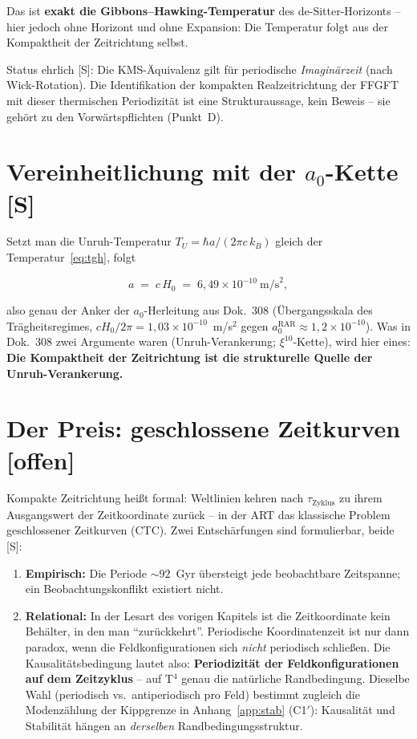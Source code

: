 \documentclass[11pt]{report}
\begin{document}
Das ist \textbf{exakt die Gibbons--Hawking-Temperatur} des
de-Sitter-Horizonts -- hier jedoch ohne Horizont und ohne Expansion:
Die Temperatur folgt aus der Kompaktheit der Zeitrichtung selbst.

Status ehrlich [S]: Die KMS-Äquivalenz gilt für periodische
\emph{Imaginärzeit} (nach Wick-Rotation). Die Identifikation der
kompakten Realzeitrichtung der FFGFT mit dieser thermischen
Periodizität ist eine Strukturaussage, kein Beweis -- sie gehört zu
den Vorwärtspflichten (Punkt~D).

\section{Vereinheitlichung mit der $a_0$-Kette [S]}

Setzt man die Unruh-Temperatur $T_U = \hbar a/(2\pi c\,k_B)$ gleich
der Temperatur~\eqref{eq:tgh}, folgt

\begin{equation}
  a \;=\; c\,H_0 \;=\; 6{,}49\times10^{-10}~\text{m/s}^2,
\end{equation}

also genau der Anker der $a_0$-Herleitung aus Dok.~308
(Übergangsskala des Trägheitsregimes, $cH_0/2\pi
= 1{,}03\times10^{-10}$~m/s$^2$ gegen
$a_0^\text{RAR} \approx 1{,}2\times10^{-10}$). Was in Dok.~308 zwei
Argumente waren (Unruh-Verankerung; $\xi^{10}$-Kette), wird hier
eines: \textbf{Die Kompaktheit der Zeitrichtung ist die strukturelle
Quelle der Unruh-Verankerung.}

\section{Der Preis: geschlossene Zeitkurven [offen]}

Kompakte Zeitrichtung heißt formal: Weltlinien kehren nach
$\tau_\text{Zyklus}$ zu ihrem Ausgangswert der Zeitkoordinate
zurück -- in der ART das klassische Problem geschlossener Zeitkurven
(CTC). Zwei Entschärfungen sind formulierbar, beide [S]:

\begin{enumerate}
  \item \textbf{Empirisch:} Die Periode $\sim 92$~Gyr übersteigt
        jede beobachtbare Zeitspanne; ein Beobachtungskonflikt
        existiert nicht.
  \item \textbf{Relational:} In der Lesart des vorigen Kapitels ist
        die Zeitkoordinate kein Behälter, in den man
        \enquote{zurückkehrt}. Periodische Koordinatenzeit ist nur
        dann paradox, wenn die Feldkonfigurationen sich \emph{nicht}
        periodisch schließen. Die Kausalitätsbedingung lautet also:
        \textbf{Periodizität der Feldkonfigurationen auf dem
        Zeitzyklus} -- auf T$^4$ genau die natürliche Randbedingung.
        Dieselbe Wahl (periodisch vs.\ antiperiodisch pro Feld)
        bestimmt zugleich die Modenzählung der Kippgrenze in
        Anhang~\ref{app:stab} (C1$'$): Kausalität und Stabilität hängen an
        \emph{derselben} Randbedingungsstruktur.
\end{enumerate}
\end{document}

